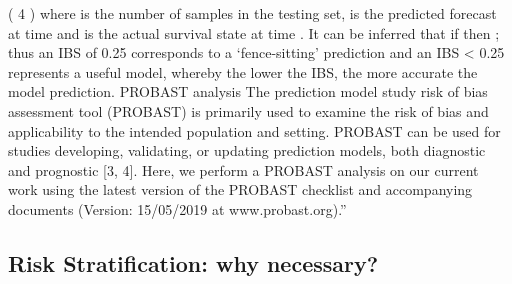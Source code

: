 \documentclass{article}%
\begin{document}
\newline%
\newline%
%
%
\newline%
\newline%
%
%
\newline%
\newline%
%
( 4 )%
\newline%
\newline%
%
where  is the number of samples in the testing set,  is the predicted forecast at time  and  is the actual survival state at time . It can be inferred that if  then ; thus an IBS of 0.25 corresponds to a ‘fence{-}sitting’ prediction and an IBS < 0.25 represents a useful model, whereby the lower the IBS, the more accurate the model prediction.%
\newline%
\newline%
%
%
\newline%
\newline%
%
PROBAST analysis%
\newline%
\newline%
%
%
\newline%
\newline%
%
The prediction model study risk of bias assessment tool (PROBAST) is primarily used to examine the risk of bias and applicability to the intended population and setting. PROBAST can be used for studies developing, validating, or updating prediction models, both diagnostic and prognostic {[}3, 4{]}. Here, we perform a PROBAST analysis on our current work using the latest version of the PROBAST checklist and accompanying documents (Version: 15/05/2019 at www.probast.org).” %
\newline%
\newline%
%
%
\newline%
\newline%
%
%
\newline%
\newline%
%
\subsection{Risk Stratification: why necessary? }%
\label{subsec:RiskStratificationwhynecessary?}%
\end{document}
